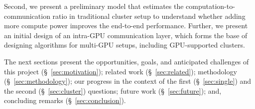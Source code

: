 Second, we present a preliminary model that estimates the computation-to-communication ratio in traditional cluster setup to understand whether adding more compute power improves the end-to-end performance. Further, we present an initial design of an intra-GPU communication layer, which forms the base of designing algorithms for multi-GPU setups, including GPU-supported clusters.

The next sections present the opportunities, goals, and anticipated challenges of this project (\S~\ref{sec:motivation}); related work (\S~\ref{sec:related}); methodology (\S~\ref{sec:methodology}); our progress in the context of the first (\S~\ref{sec:single}) and the second (\S~\ref{sec:cluster}) questions; future work (\S~\ref{sec:future}); and, concluding remarks (\S ~\ref{sec:conclusion}).
